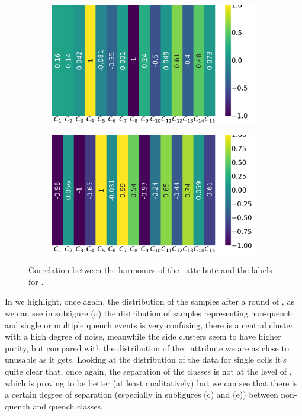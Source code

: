 \begin{figure}[!h]
\begin{subfigure}{0.49\linewidth}
	\end{subfigure}
	\begin{subfigure}{0.49\linewidth}
		\includegraphics[width=\linewidth]{img/qlp_corr/Bn_coil2.png}
	\end{subfigure}
	\begin{subfigure}{0.49\linewidth}
		\includegraphics[width=\linewidth]{img/qlp_corr/Bn_coil3.png}
	\end{subfigure}
	\caption{Correlation between the harmonics of the \bn\ attribute and the labels for \qlp.}
	\label{fig:bn-lcorr-qlp}
\end{figure}

In  we highlight, once again, the distribution of the samples after a round
of \pca, as we can see in subfigure (a) the distribution of samples representing non-quench and
single or multiple quench events is very confusing, there is a central cluster with a high degree of
noise, meanwhile the side clusters seem to have higher purity, but compared with the distribution of
the \an\ attribute we are as close to unusable as it gets. Looking at the distribution of the data
for single coils it's quite clear that, once again, the separation of the classes is not at the level
of \an, which is proving to be better (at least qualitatively) but we can see that there is a
certain degree of separation (especially in subfigures (c) and (e)) between non-quench and quench
classes.

